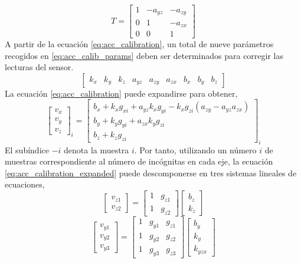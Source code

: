 \documentclass[a4paper,12pt]{book}
\begin{document}
\begin{equation}
    T = \begin{bmatrix} 1 & -a_{yz} & -a_{zy} \\ 0 & 1 & -a_{zx} \\ 0 &0&1   \end{bmatrix}
\end{equation}
A partir de la ecuación \eqref{eq:acc_calibration}, un total de nueve parámetros recogidos en \eqref{eq:acc_calib_params} deben ser determinados para corregir las lecturas del sensor.
\begin{equation}\label{eq:acc_calib_params}
    \begin{bmatrix} k_x & k_y & k_z &a_{yz} & a_{zy} & a_{zx} & b_x & b_y & b_z    \end{bmatrix}
\end{equation}
La ecuación \eqref{eq:acc_calibration} puede expandirse para obtener,
\begin{equation}\label{eq:acc_calibration_expanded}
    \begin{bmatrix} v_x \\ v_y \\ v_z    \end{bmatrix}_i = \begin{bmatrix} b_x + k_x g_{xi} + a_{yz}k_xg_{yi} - k_xg_{zi}(a_{zy} - a_{yz}a_{zx}) \\ b_y + k_y g_{yi} + a_{zx}k_y g_{zi} \\ b_z + k_zg_{zi}\end{bmatrix}_i
\end{equation}
El subíndice $-i$ denota la muestra $i$. Por tanto, utilizando un número $i$ de muestras correspondiente al número de incógnitas en cada eje, la ecuación \eqref{eq:acc_calibration_expanded} puede descomponerse en tres sistemas lineales de ecuaciones,
\begin{equation}
    \begin{bmatrix} v_{z1} \\ v_{z2}   \end{bmatrix} = \begin{bmatrix} 1& g_{z1} \\ 1& g_{z2}    \end{bmatrix} \begin{bmatrix} b_z \\ k_z    \end{bmatrix}
\end{equation}
\begin{equation}
    \begin{bmatrix} v_{y1}\\ v_{y2} \\ v_{y3}   \end{bmatrix} = \begin{bmatrix} 1& g_{y1} & g_{z1} \\ 1& g_{y2} & g_{z2} \\ 1 & g_{y3} & g_{z3}    \end{bmatrix} \begin{bmatrix} b_y \\ k_y \\ k_{yzx}   \end{bmatrix}
\end{equation}
\end{document}
